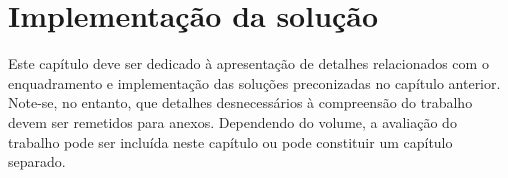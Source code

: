 \chapter{Implementa\c{c}\~ao da solu\c{c}\~ao} %
\label{chap:impl}

Este capítulo deve ser dedicado à apresentação de detalhes relacionados com o enquadramento e implementação das soluções preconizadas no capítulo anterior. Note-se, no entanto, que detalhes desnecessários à compreensão do trabalho devem ser remetidos para anexos. Dependendo do volume, a avaliação do trabalho pode ser incluída neste capítulo ou pode constituir um capítulo separado.





